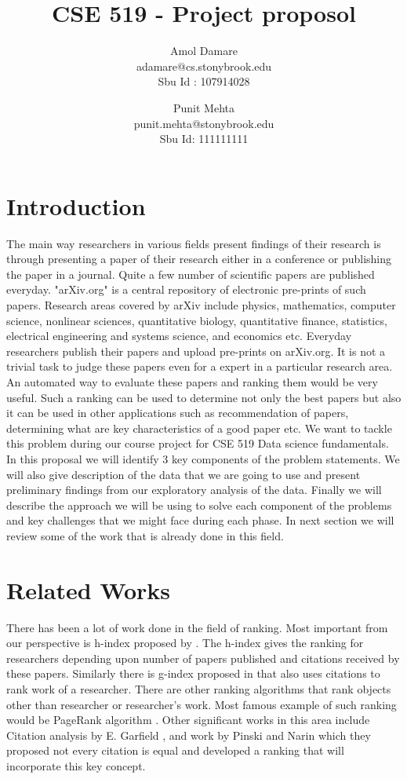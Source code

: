 \documentclass[a4paper, 11pt]{article}
\begin{document}
\title{CSE 519 - Project proposol}
\author{Amol Damare \\ adamare@cs.stonybrook.edu \\Sbu Id : 107914028
\and
Punit Mehta \\ punit.mehta@stonybrook.edu \\Sbu Id: 111111111}
\maketitle
\section{Introduction}
The main way researchers in various fields present findings of their research is through presenting a paper of their research either in a conference or publishing the paper in a journal. Quite a few number of scientific papers are published everyday. "arXiv.org" is a central repository of electronic pre-prints of such papers. Research areas covered by arXiv include physics, mathematics, computer science, nonlinear sciences, quantitative biology, quantitative finance, statistics, electrical engineering and systems science, and economics etc.  Everyday researchers publish their papers and upload pre-prints on arXiv.org.  It is not a trivial task to judge these papers even for a expert in a particular research area. An automated way to evaluate these papers and ranking them would be very useful. Such a ranking can be used to determine not only the best papers but also it can be used in other applications such as recommendation of papers, determining what are key characteristics of a good paper etc. We want to tackle this problem during our course project for CSE 519 Data science fundamentals. In this proposal we will identify 3 key components of the problem statements. We will also give description of the data that we are going to use and present preliminary findings from our exploratory analysis of the data.  Finally we will describe the approach we will be using to solve each component of the problems and key challenges that we might face during each phase. In next section we will review some of the work that is already done in this field.
\section{Related Works}
There has been a lot of work done in the field of ranking. Most important from our perspective is h-index proposed by \cite{Hirsch}. The h-index gives the ranking for researchers depending upon number of papers published and citations received by these papers.
Similarly there is g-index proposed in \cite{gindex} that also uses citations to rank work of a researcher. There are other ranking algorithms that rank objects other than researcher or researcher's work. Most famous example of such ranking would be PageRank algorithm \cite{pagerank}. Other significant works in this area include Citation analysis by E. Garfield \cite{garfield}, and work by Pinski and Narin \cite{pinski} which they proposed not every citation is equal and developed a ranking that will incorporate this key concept.
\end{document}
